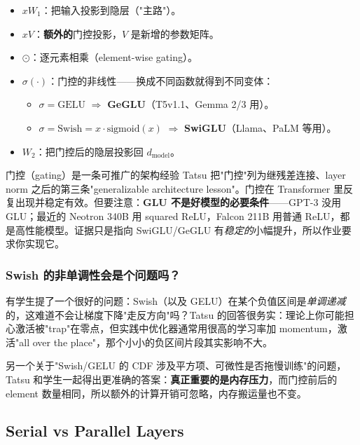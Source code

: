 \documentclass[a4paper]{article}
\begin{document}
\begin{itemize}
    \item $x W_1$：把输入投影到隐层（"主路"）。
    \item $x V$：\textbf{额外的}门控投影，$V$ 是新增的参数矩阵。
    \item $\odot$：逐元素相乘（element-wise gating）。
    \item $\sigma(\cdot)$：门控的非线性——换成不同函数就得到不同变体：
    \begin{itemize}
        \item $\sigma = \mathrm{GELU}$ $\Rightarrow$ \textbf{GeGLU}（T5v1.1、Gemma 2/3 用）。
        \item $\sigma = \mathrm{Swish} = x \cdot \mathrm{sigmoid}(x)$ $\Rightarrow$ \textbf{SwiGLU}（Llama、PaLM 等用）。
    \end{itemize}
    \item $W_2$：把门控后的隐层投影回 $d_{\mathrm{model}}$。
\end{itemize}

\begin{importantbox}{门控（gating）是一条可推广的架构经验}
Tatsu 把"门控"列为继残差连接、layer norm 之后的第三条"generalizable architecture lesson"。门控在 Transformer 里反复出现并稳定有效。但要注意：\textbf{GLU 不是好模型的必要条件}——GPT-3 没用 GLU；最近的 Neotron 340B 用 squared ReLU，Falcon 211B 用普通 ReLU，都是高性能模型。证据只是指向 SwiGLU/GeGLU 有\emph{稳定的}小幅提升，所以作业要求你实现它。
\end{importantbox}

\subsubsection{Swish 的非单调性会是个问题吗？}

有学生提了一个很好的问题：Swish（以及 GELU）在某个负值区间是\emph{单调递减}的，这难道不会让梯度下降"走反方向"吗？Tatsu 的回答很务实：理论上你可能担心激活被"trap"在零点，但实践中优化器通常用很高的学习率加 momentum，激活"all over the place"，那个小小的负区间片段其实影响不大。

另一个关于"Swish/GELU 的 CDF 涉及平方项、可微性是否拖慢训练"的问题，Tatsu 和学生一起得出更准确的答案：\textbf{真正重要的是内存压力}，而门控前后的 element 数量相同，所以额外的计算开销可忽略，内存搬运量也不变。

\subsection{Serial vs Parallel Layers}
\end{document}
